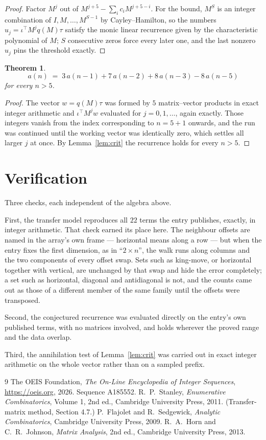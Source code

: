 \documentclass[11pt,a4paper]{article}
\theoremstyle{plain}
\newtheorem{theorem}{Theorem}
\theoremstyle{definition}
\begin{document}
\begin{proof}
Factor $M^{j}$ out of $M^{j+5}-\sum_ic_iM^{j+5-i}$. For the bound, $M^{S}$
is an integer combination of $I,M,\dots,M^{S-1}$ by Cayley--Hamilton, so the numbers
$u_j=\iota^{\!\top}M^{j}q(M)\tau$ satisfy the monic linear recurrence given by the
characteristic polynomial of $M$; $S$ consecutive zeros force every later one, and the last
nonzero $u_j$ pins the threshold exactly.
\end{proof}

\begin{theorem}
\[
a(n)\;=\;3\,a(n-1) + 7\,a(n-2) + 8\,a(n-3) - 8\,a(n-5)
\]
for every $n>5$.
\end{theorem}

\begin{proof}
The vector $w=q(M)\tau$ was formed by $5$ matrix--vector products in exact integer
arithmetic and $\iota^{\!\top}M^{j}w$ evaluated for $j=0,1,\dots$, again exactly. Those
integers vanish from the index corresponding to $n=5+1$ onwards, and the run was
continued until the working vector was identically zero, which settles all larger $j$ at once.
By Lemma~\ref{lem:crit} the recurrence holds for every $n>5$.
\end{proof}

\section{Verification}

Three checks, each independent of the algebra above.

First, the transfer model reproduces all $22$ terms the entry publishes, exactly, in
integer arithmetic. That check earned its place here. The neighbour offsets are named in the
array's own frame --- horizontal means along a row --- but when the entry fixes the first
dimension, as in ``$2\times n$'', the walk runs along columns and the two components of every
offset swap. Sets such as king-move, or horizontal together with vertical, are unchanged by
that swap and hide the error completely; a set such as horizontal, diagonal and antidiagonal
is not, and the counts came out as those of a different member of the same family until the
offsets were transposed.

Second, the conjectured recurrence was evaluated directly on the entry's own published terms,
with no matrices involved, and holds wherever the proved range and the data overlap.

Third, the annihilation test of Lemma~\ref{lem:crit} was carried out in exact integer
arithmetic on the whole vector rather than on a sampled prefix.

\begin{thebibliography}{9}
 The OEIS Foundation, \emph{The On-Line Encyclopedia of Integer
Sequences}, \url{https://oeis.org}, 2026. Sequence A185552.
 R.~P.~Stanley, \emph{Enumerative Combinatorics}, Volume 1, 2nd ed.,
Cambridge University Press, 2011. (Transfer-matrix method, Section 4.7.)
 P.~Flajolet and R.~Sedgewick, \emph{Analytic Combinatorics}, Cambridge
University Press, 2009.
 R.~A.~Horn and C.~R.~Johnson, \emph{Matrix Analysis}, 2nd ed., Cambridge
University Press, 2013.
\end{thebibliography}
\end{document}
